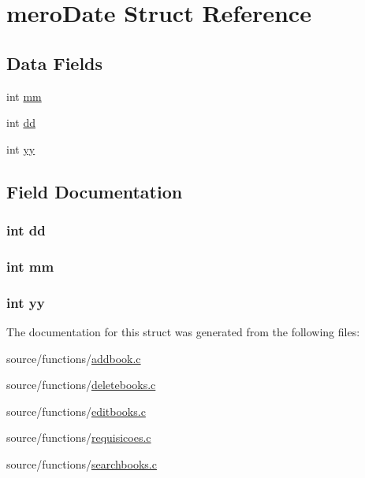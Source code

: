 \hypertarget{structmero_date}{\section{mero\+Date Struct Reference}
\label{structmero_date}
}
\subsection*{Data Fields}
\begin{DoxyCompactItemize}
\item 
int \hyperlink{structmero_date_a34c26acca324499b464752be283dc36f}{mm}
\item 
int \hyperlink{structmero_date_aa1e1f98f915215f8f5ba21493e27c0d5}{dd}
\item 
int \hyperlink{structmero_date_a12edb164c258a960c65807e655466072}{yy}
\end{DoxyCompactItemize}


\subsection{Field Documentation}
\hypertarget{structmero_date_aa1e1f98f915215f8f5ba21493e27c0d5}{
\subsubsection[{dd}]{\setlength{\rightskip}{0pt plus 5cm}int dd}}\label{structmero_date_aa1e1f98f915215f8f5ba21493e27c0d5}
\hypertarget{structmero_date_a34c26acca324499b464752be283dc36f}{
\subsubsection[{mm}]{\setlength{\rightskip}{0pt plus 5cm}int mm}}\label{structmero_date_a34c26acca324499b464752be283dc36f}
\hypertarget{structmero_date_a12edb164c258a960c65807e655466072}{
\subsubsection[{yy}]{\setlength{\rightskip}{0pt plus 5cm}int yy}}\label{structmero_date_a12edb164c258a960c65807e655466072}


The documentation for this struct was generated from the following files\+:\begin{DoxyCompactItemize}
\item 
source/functions/\hyperlink{addbook_8c}{addbook.\+c}\item 
source/functions/\hyperlink{deletebooks_8c}{deletebooks.\+c}\item 
source/functions/\hyperlink{editbooks_8c}{editbooks.\+c}\item 
source/functions/\hyperlink{requisicoes_8c}{requisicoes.\+c}\item 
source/functions/\hyperlink{searchbooks_8c}{searchbooks.\+c}\end{DoxyCompactItemize}
